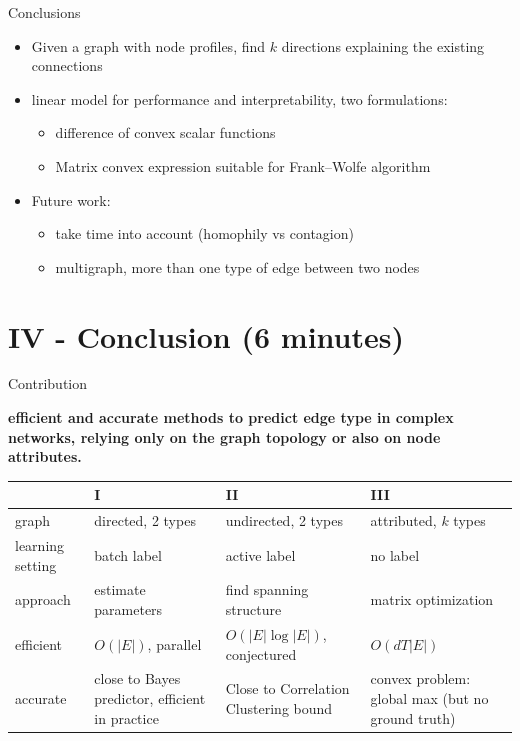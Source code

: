 \documentclass[10pt,svgnames,ignorenonframetext,final]{beamer}
\begin{document}
\begin{frame}{Conclusions}

\begin{itemize}
    \item
      Given a graph with node profiles, find $k$ directions explaining the existing connections
    \item
      linear model for performance and interpretability, two formulations:
    \begin{itemize}
      \item difference of convex scalar functions
      \item Matrix convex expression suitable for Frank--Wolfe algorithm
    \end{itemize}
    \item
      Future work:
    \begin{itemize}
      \item take time into account (homophily vs contagion)
      \item multigraph, more than one type of edge between two nodes
    \end{itemize}
\end{itemize}

\end{frame}

\section{IV - Conclusion (6 minutes)}
\label{iv---conclusion-6-minutes}

\begin{frame}{Contribution}
\protect\hypertarget{contribution}{}

\textbf{efficient and accurate methods to predict edge type in complex
networks, relying only on the graph topology or also on node
attributes.}

\begin{adjustwidth}{-.31cm}{}
  \small
  \setlength{\tabcolsep}{4pt}
  \begin{tabulary}{0.9\paperwidth}{lLLL}
    \toprule
    & I & II & III \\
    \midrule
    graph            & directed, 2 types      & undirected, 2 types           & attributed, $k$ types \\
    learning setting & batch label            & active label                  & no label \\
    approach         & estimate parameters    & find spanning structure       & matrix optimization \\
    efficient        & $O(|E|)$, parallel & $O(|E|\log |E|)$, conjectured & $O(dT|E|)$ \\
    accurate &
    close to Bayes predictor, efficient in practice &
    Close to Correlation Clustering bound &
    convex problem: global max (but no ground truth) \\
    \bottomrule
  \end{tabulary}
\end{adjustwidth}

\end{frame}
\end{document}
